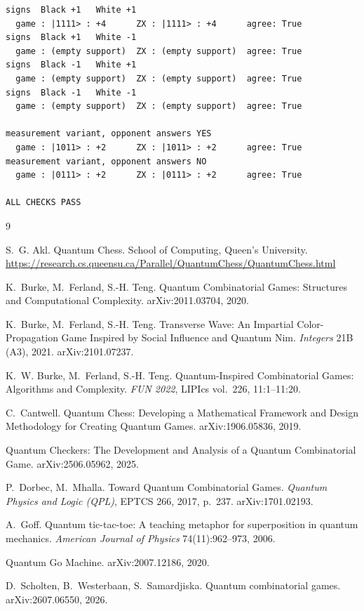 \documentclass[11pt,a4paper]{article}
\theoremstyle{definition}
\theoremstyle{plain}
\begin{document}
\begin{lstlisting}
signs  Black +1   White +1
  game : |1111> : +4      ZX : |1111> : +4      agree: True
signs  Black +1   White -1
  game : (empty support)  ZX : (empty support)  agree: True
signs  Black -1   White +1
  game : (empty support)  ZX : (empty support)  agree: True
signs  Black -1   White -1
  game : (empty support)  ZX : (empty support)  agree: True

measurement variant, opponent answers YES
  game : |1011> : +2      ZX : |1011> : +2      agree: True
measurement variant, opponent answers NO
  game : |0111> : +2      ZX : |0111> : +2      agree: True

ALL CHECKS PASS
\end{lstlisting}

\begin{thebibliography}{9}

S.~G. Akl.
\newblock Quantum Chess.
\newblock School of Computing, Queen's University.
\newblock \url{https://research.cs.queensu.ca/Parallel/QuantumChess/QuantumChess.html}

K.~Burke, M.~Ferland, S.-H. Teng.
\newblock Quantum Combinatorial Games: Structures and Computational Complexity.
\newblock arXiv:2011.03704, 2020.

K.~Burke, M.~Ferland, S.-H. Teng.
\newblock Transverse Wave: An Impartial Color-Propagation Game Inspired by
Social Influence and Quantum Nim.
\newblock \emph{Integers} 21B (A3), 2021. arXiv:2101.07237.

K.~W. Burke, M.~Ferland, S.-H. Teng.
\newblock Quantum-Inspired Combinatorial Games: Algorithms and Complexity.
\newblock \emph{FUN 2022}, LIPIcs vol.~226, 11:1--11:20.

C.~Cantwell.
\newblock Quantum Chess: Developing a Mathematical Framework and Design
Methodology for Creating Quantum Games.
\newblock arXiv:1906.05836, 2019.

Quantum Checkers: The Development and Analysis of a Quantum Combinatorial Game.
\newblock arXiv:2506.05962, 2025.

P.~Dorbec, M.~Mhalla.
\newblock Toward Quantum Combinatorial Games.
\newblock \emph{Quantum Physics and Logic (QPL)}, EPTCS 266, 2017, p.~237.
arXiv:1701.02193.

A.~Goff.
\newblock Quantum tic-tac-toe: A teaching metaphor for superposition in quantum
mechanics.
\newblock \emph{American Journal of Physics} 74(11):962--973, 2006.

Quantum Go Machine.
\newblock arXiv:2007.12186, 2020.

D.~Scholten, B.~Westerbaan, S.~Samardjiska.
\newblock Quantum combinatorial games.
\newblock arXiv:2607.06550, 2026.

\end{thebibliography}
\end{document}
